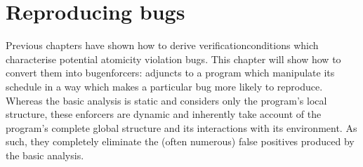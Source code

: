 \chapter{Reproducing bugs}
\label{sect:reproducing_bugs}

Previous chapters have shown how to derive
\glspl{verificationcondition} which characterise potential atomicity
violation bugs.  This chapter will show how to convert them into
\glspl{bugenforcer}: adjuncts to a program which manipulate its
schedule in a way which makes a particular bug more likely to
reproduce.  Whereas the basic analysis is static and considers only
the program's local structure, these enforcers are dynamic and
inherently take account of the program's complete global structure and
its interactions with its environment.  As such, they completely
eliminate the (often numerous) false positives produced by the basic
analysis.

